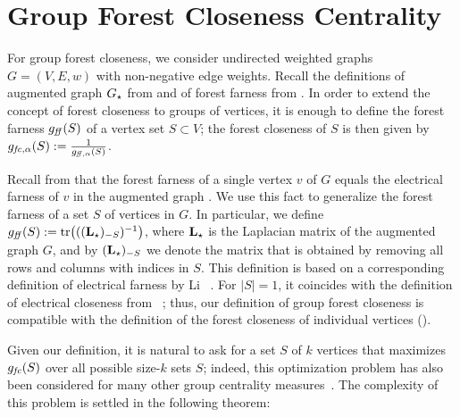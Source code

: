 \section{Group Forest Closeness Centrality}
\label{sec:el-clos:group-forest-clos}
For group forest closeness, we consider undirected weighted graphs
$G = (V, E, w)$ with non-negative edge weights.
Recall the definitions of augmented graph $G_{\star}$ from
 and of forest farness from
.
In order to extend the concept of forest closeness to groups of vertices,
it is enough to define the forest farness $g_{\mathit{ff}}(S)$ of a vertex set
$S\subset V$; the forest closeness of $S$ is then given by $g_{\mathit{fc},\alpha}(S) :=
\frac{1}{g_{\mathit{ff},\alpha}(S)}$.

Recall from  that the forest farness of a single
vertex $v$ of $G$ equals the electrical farness of $v$ in the augmented graph \gstar.
We use this fact to generalize the forest farness of a set $S$ of vertices in $G$.
In particular, we define $\gffarn(S) := \tr{((\Lstar)_{-S})^{-1}}$, where $\mathbf{L_{\star}}$
is the Laplacian matrix of the augmented graph $G$, and by $(\mathbf{L_{\star}})_{-S}$ we denote the
matrix that is obtained by removing all rows and columns with indices in $S$.
This definition is based on a corresponding definition of electrical farness by Li
\etal~\cite{DBLP:conf/www/0002PSYZ19}. For $|S| = 1$, it coincides with the
definition of electrical closeness from
~\cite{izmailian2013two}; thus, our definition of
group forest closeness is compatible with the definition of the forest
closeness of individual vertices (\ie {}).

Given our definition, it is natural to ask for a set $S$ of $k$ vertices that
maximizes $g_{\mathit{fc}}(S)$ over all possible size-$k$ sets $S$; indeed, this
optimization problem has also been considered for many other group centrality
measures~\cite{DBLP:journals/it/GrintenAM20}.
The complexity of this problem is settled in the following theorem:

